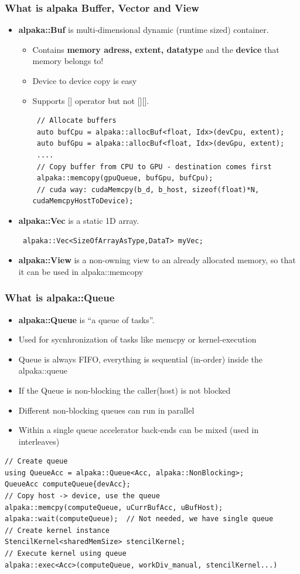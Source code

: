 \documentclass[9pt]{beamer}
\begin{document}
\begin{frame} [fragile]
\frametitle{What is alpaka Buffer, Vector and View}
\begin{itemize}
 \item \textbf{alpaka::Buf} is multi-dimensional dynamic (runtime sized) container.
 \begin{itemize}
 \item Contains \textbf{memory adress, extent, datatype} and the \textbf{device} that memory belongs to!
 \item Device to device copy is easy
 \item Supports [] operator but not [][].
 \lstset{basicstyle=\ttfamily\scriptsize}
 \begin{lstlisting}
 // Allocate buffers
 auto bufCpu = alpaka::allocBuf<float, Idx>(devCpu, extent);
 auto bufGpu = alpaka::allocBuf<float, Idx>(devGpu, extent);
 ....
 // Copy buffer from CPU to GPU - destination comes first
 alpaka::memcopy(gpuQueue, bufGpu, bufCpu);
 // cuda way: cudaMemcpy(b_d, b_host, sizeof(float)*N, cudaMemcpyHostToDevice);
 \end{lstlisting}
 \end{itemize}
 \item \textbf{alpaka::Vec} is a static 1D array.
 \begin{lstlisting}
 alpaka::Vec<SizeOfArrayAsType,DataT> myVec;
 \end{lstlisting}
 \item \textbf{alpaka::View} is a non-owning view to an already allocated memory, so that it can be used in alpaka::memcopy
\end{itemize}
    \end{frame}


\begin{frame} [fragile]
\frametitle{What is alpaka::Queue}
\begin{itemize}
 \item \textbf{alpaka::Queue} is “a queue of tasks”.
 \item Used for sycnhronization of tasks like memcpy or kernel-execution
 \item Queue is always FIFO, everything is sequential (in-order) inside the alpaka::queue
 \item If the Queue is non-blocking the caller(host) is not blocked
 \item Different non-blocking queues can run in parallel
 \item Within a single queue accelerator back-ends can be mixed (used in interleaves)
\end{itemize}
\lstset{basicstyle=\ttfamily\scriptsize}
\begin{lstlisting}
// Create queue
using QueueAcc = alpaka::Queue<Acc, alpaka::NonBlocking>;
QueueAcc computeQueue{devAcc};
// Copy host -> device, use the queue
alpaka::memcpy(computeQueue, uCurrBufAcc, uBufHost);
alpaka::wait(computeQueue);  // Not needed, we have single queue
// Create kernel instance
StencilKernel<sharedMemSize> stencilKernel;
// Execute kernel using queue
alpaka::exec<Acc>(computeQueue, workDiv_manual, stencilKernel...)
\end{lstlisting}
\end{frame}
\end{document}
